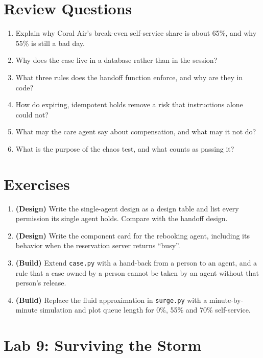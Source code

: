 \section*{Review Questions}

\begin{enumerate}[itemsep=2pt]
  \item Explain why Coral Air's break-even self-service share is about 65\%, and why 55\% is still a bad day.
  \item Why does the case live in a database rather than in the session?
  \item What three rules does the handoff function enforce, and why are they in code?
  \item How do expiring, idempotent holds remove a risk that instructions alone could not?
  \item What may the care agent say about compensation, and what may it not do?
  \item What is the purpose of the chaos test, and what counts as passing it?
\end{enumerate}

\section*{Exercises}

\begin{enumerate}[itemsep=2pt]
  \item \textbf{(Design)} Write the single-agent design as a design table and list every permission its single agent holds. Compare with the handoff design.
  \item \textbf{(Design)} Write the component card for the rebooking agent, including its behavior when the reservation server returns ``busy''.
  \item \textbf{(Build)} Extend \texttt{case.py} with a hand-back from a person to an agent, and a rule that a case owned by a person cannot be taken by an agent without that person's release.
  \item \textbf{(Build)} Replace the fluid approximation in \texttt{surge.py} with a minute-by-minute simulation and plot queue length for 0\%, 55\% and 70\% self-service.
\end{enumerate}

\section*{Lab 9: Surviving the Storm}

